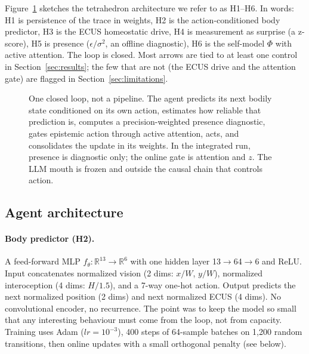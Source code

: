 \documentclass[11pt,a4paper]{article}
\begin{document}
Figure~\ref{fig:tetra} sketches the tetrahedron architecture we refer to as H1--H6. In words: H1 is persistence of the trace in weights, H2 is the action-conditioned body predictor, H3 is the ECUS homeostatic drive, H4 is measurement as surprise (a z-score), H5 is presence ($\epsilon/\sigma^2$, an offline diagnostic), H6 is the self-model $\Phi$ with active attention. The loop is closed. Most arrows are tied to at least one control in Section~\ref{sec:results}; the few that are not (the ECUS drive and the attention gate) are flagged in Section~\ref{sec:limitations}.

\begin{figure}[h]
\centering
{}
\caption{One closed loop, not a pipeline. The agent predicts its next bodily state conditioned on its own action, estimates how reliable that prediction is, computes a precision-weighted presence diagnostic, gates epistemic action through active attention, acts, and consolidates the update in its weights. In the integrated run, presence is diagnostic only; the online gate is attention and $z$. The LLM mouth is frozen and outside the causal chain that controls action.}
\label{fig:tetra}
\end{figure}

\subsection{Agent architecture}

\paragraph{Body predictor (H2).} A feed-forward MLP $f_\theta: \mathbb{R}^{13} \rightarrow \mathbb{R}^{6}$ with one hidden layer 13$\rightarrow$64$\rightarrow$6 and ReLU. Input concatenates normalized vision (2 dims: $x/W$, $y/W$), normalized interoception (4 dims: $H/1.5$), and a 7-way one-hot action. Output predicts the next normalized position (2 dims) and next normalized ECUS (4 dims). No convolutional encoder, no recurrence. The point was to keep the model so small that any interesting behaviour must come from the loop, not from capacity. Training uses Adam ($lr=10^{-3}$), 400 steps of 64-sample batches on 1,200 random transitions, then online updates with a small orthogonal penalty (see below).
\end{document}
